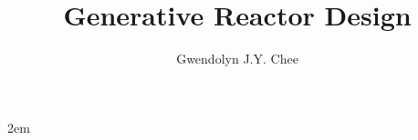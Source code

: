 \documentclass[edeposit,fullpage,12pt]{uiucthesis2009}
\title{Generative Reactor Design}
\author{Gwendolyn J.Y. Chee}
\begin{document}

%
\justify
\parindent 2em%

%

%
\tableofcontents

%

%

%



%

\mainmatter

%
%	
%

%
%
%
%

%
%

\backmatter

%


\end{document}
